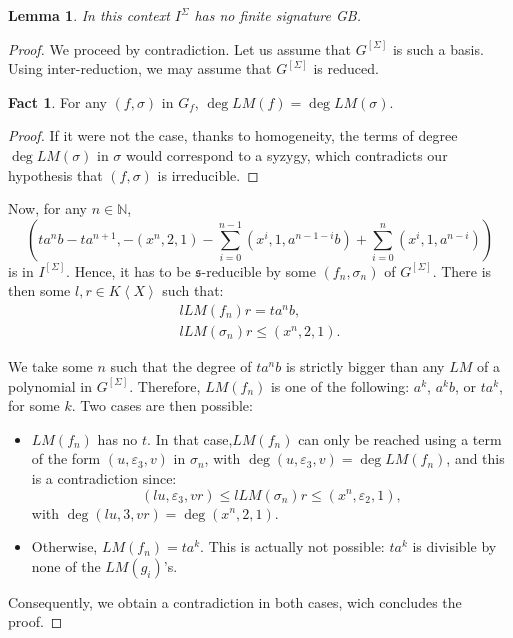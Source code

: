 \documentclass[sigconf]{acmart}
\theoremstyle{plain}
\newtheorem{lem}{Lemma}[section]
\theoremstyle{definition}
\newtheorem*{fact}{Fact}
\theoremstyle{remark}
\newcommand{\N}{\mathbb{N}}
\newcommand{\sss}{\mathfrak{s}}
\newcommand{\LM}{LM}
\newcommand{\GS}{G^{[\Sigma]}}
\newcommand{\KX}{K \left\langle X \right\rangle}
\begin{document}
\begin{lem}
	In this context
	$I^\Sigma$ has no
	finite signature GB.
\end{lem}
\begin{proof}
We proceed by contradiction.
Let us assume that $G^{[\Sigma]}$ is such 
a basis.
Using inter-reduction,
we may assume that
$G^{[\Sigma]}$
is reduced.	
	
	\begin{fact}
		For any $(f,\sigma)$ in $G_f$, $\deg{\LM(f)} = \deg{\LM(\sigma)}$.
	\end{fact}
	\begin{proof}
	If it were not the case,
	 thanks to
	homogeneity,
	the terms of 
	degree  $\deg{\LM(\sigma)}$ in $\sigma$ would correspond to
	a syzygy, which contradicts our hypothesis
	that $(f,\sigma)$ is
	irreducible.
	\end{proof}
	
Now, for any $n \in \N$,
	$$\left(ta^nb - ta^{n+1}, - (x^n, 2, 1)
		- \sum_{i = 0}^{n - 1}(x^i, 1, a^{n - 1 - i}b) + 
		\sum_{i = 0}^{n} (x^i, 1, a^{n - i})
		  \right)$$
	is in $I^{[\Sigma]}.$
Hence, it has to be
$\sss$-reducible
by some 
 $(f_n, \sigma_n)$ of $G^{[\Sigma]}$.
 There is then some
 $l, r \in \KX$ such that:
	\begin{align*}
		l\LM(f_n)r = ta^nb, \\
		l \LM(\sigma_n) r \leq (x^n, 2, 1).
	\end{align*}
	
We take some $n$
such that 
the degree of $ta^nb$
is strictly bigger
than any $\LM$
of a polynomial
in $\GS$. 
	Therefore, $\LM(f_n)$ is one of the following: $a^k$, $a^kb$, or $ta^k$,
	for some $k.$
Two cases are then possible:	
	\begin{itemize}
		\item $\LM(f_n)$ 
		has no $t$. 
		In that case,$\LM(f_n)$  can only
be reached using 
a term of the form
$(u, \varepsilon_3, v)$ 
in $\sigma_n$, with $\deg (u, \varepsilon_3, v) = \deg \LM(f_n)$,
and this is a contradiction
since:
		$$(lu, \varepsilon_3, vr) \leq l \LM(\sigma_n) r \leq (x^n, \varepsilon_2, 1),$$
		with $\deg (lu, 3, vr) = \deg (x^n, 2, 1)$.
		
		\item Otherwise, $\LM(f_n) = ta^k$.
		This is actually
not possible:
$ta^k$ is divisible
by none of the $\LM(g_i)$'s.
	\end{itemize}
Consequently, we obtain
a contradiction in both
cases, wich concludes
the proof.
\end{proof}
\end{document}
